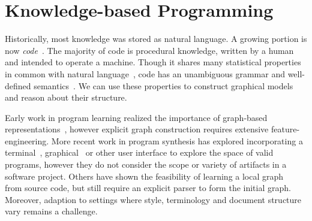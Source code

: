 \documentclass[12pt]{article}
\newcommand*\circled[1]{\tikz[baseline=-0.1cm]{\node[shape=circle,draw,inner sep=0.48pt] (char) {\fontsize{7}{12}\textsf{#1}};}}
\begin{document}
%
%

\section{Knowledge-based Programming}\label{sec:knowledge-based-programming}

Historically, most knowledge was stored as natural language. A growing portion is now \textit{code}~\cite{allamanis2018survey}. The majority of code is procedural knowledge, written by a human and intended to operate a machine. Though it shares many statistical properties in common with natural language~\cite{hindle2012naturalness}, code has an unambiguous grammar and well-defined semantics~\cite{pierce2010software}. We can use these properties to construct graphical models and reason about their structure.

Early work in program learning realized the importance of graph-based representations~\cite{allamanis2017learning}, however explicit graph construction requires extensive feature-engineering. More recent work in program synthesis has explored incorporating a terminal~\cite{ellis2019write}, graphical~\cite{walke2020learning} or other user interface to explore the space of valid programs, however they do not consider the scope or variety of artifacts in a software project. Others have shown the feasibility of learning a local graph~\cite{johnson2020learning} from source code, but still require an explicit parser to form the initial graph. Moreover, adaption to settings where style, terminology and document structure vary remains a challenge.
\end{document}
